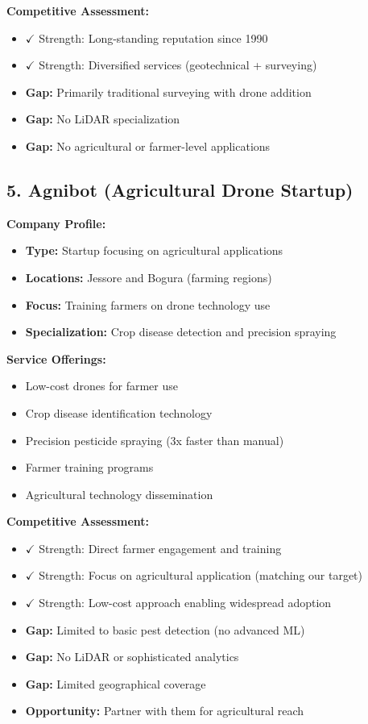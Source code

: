 \textbf{Competitive Assessment:}
\begin{itemize}
    \item \textcolor{AccentGreen}{$\checkmark$ Strength:} Long-standing reputation since 1990
    \item \textcolor{AccentGreen}{$\checkmark$ Strength:} Diversified services (geotechnical + surveying)
    \item \textbf{Gap:} Primarily traditional surveying with drone addition
    \item \textbf{Gap:} No LiDAR specialization
    \item \textbf{Gap:} No agricultural or farmer-level applications
\end{itemize}

\subsection{5. Agnibot (Agricultural Drone Startup)}

\textbf{Company Profile:}
\begin{itemize}
    \item \textbf{Type:} Startup focusing on agricultural applications
    \item \textbf{Locations:} Jessore and Bogura (farming regions)
    \item \textbf{Focus:} Training farmers on drone technology use
    \item \textbf{Specialization:} Crop disease detection and precision spraying
\end{itemize}

\textbf{Service Offerings:}
\begin{itemize}
    \item Low-cost drones for farmer use
    \item Crop disease identification technology
    \item Precision pesticide spraying (3x faster than manual)
    \item Farmer training programs
    \item Agricultural technology dissemination
\end{itemize}

\textbf{Competitive Assessment:}
\begin{itemize}
    \item \textcolor{AccentGreen}{$\checkmark$ Strength:} Direct farmer engagement and training
    \item \textcolor{AccentGreen}{$\checkmark$ Strength:} Focus on agricultural application (matching our target)
    \item \textcolor{AccentGreen}{$\checkmark$ Strength:} Low-cost approach enabling widespread adoption
    \item \textbf{Gap:} Limited to basic pest detection (no advanced ML)
    \item \textbf{Gap:} No LiDAR or sophisticated analytics
    \item \textbf{Gap:} Limited geographical coverage
    \item \textbf{Opportunity:} Partner with them for agricultural reach
\end{itemize}

